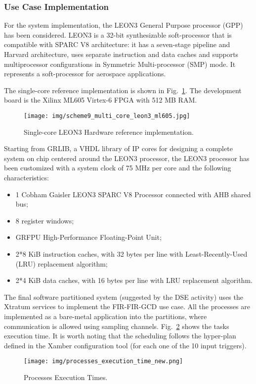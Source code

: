 \subsubsection{Use Case Implementation}
%
For the system implementation, the LEON3 General Purpose processor (GPP) has been considered. LEON3 is a 32-bit synthesizable soft-processor that is compatible with SPARC V8 architecture: it has a seven-stage pipeline and Harvard architecture, uses separate instruction and data caches and supports multiprocessor configurations in Symmetric Multi-processor (SMP) mode. It represents a soft-processor for aerospace applications. \par
The single-core reference implementation is shown in Fig.~\ref{fig1}. The development board is the Xilinx ML605 Virtex-6 FPGA with 512 MB RAM. \par
%
\begin{figure}[htbp]
\centerline{\texttt{[image: img/scheme9\_multi\_core\_leon3\_ml605.jpg]}}
\caption{Single-core LEON3 Hardware reference implementation.}
\label{fig1}
\end{figure}
%
Starting from GRLIB, a VHDL library of IP cores for designing a complete system on chip centered around the LEON3 processor, the LEON3 processor has been customized with a system clock of 75 MHz per core and the following characteristics:
%
\begin{itemize}
    \item 1 Cobham Gaisler LEON3 SPARC V8 Processor connected with AHB shared bus;
    \item 8 register windows;
    \item GRFPU High-Performance Floating-Point Unit;
    \item 2*8 KiB instruction caches, with 32 bytes per line with Least-Recently-Used (LRU) replacement algorithm;
    \item 2*4 KiB data caches, with 16 bytes per line with LRU replacement algorithm.
\end{itemize}
%
The final software partitioned system (suggested by the DSE activity) uses the Xtratum services to implement the FIR-FIR-GCD use case. All the processes are implemented as a bare-metal application into the partitions, where communication is allowed using sampling channels. Fig.~\ref{fig1_tasks} shows the tasks execution time. It is worth noting that the scheduling follows the hyper-plan defined in the Xamber configuration tool (for each one of the 10 input triggers). \par
%
\begin{figure}[htbp]
\centerline{\texttt{[image: img/processes\_execution\_time\_new.png]}}
\caption{Processes Execution Times.}
\label{fig1_tasks}
\end{figure}
